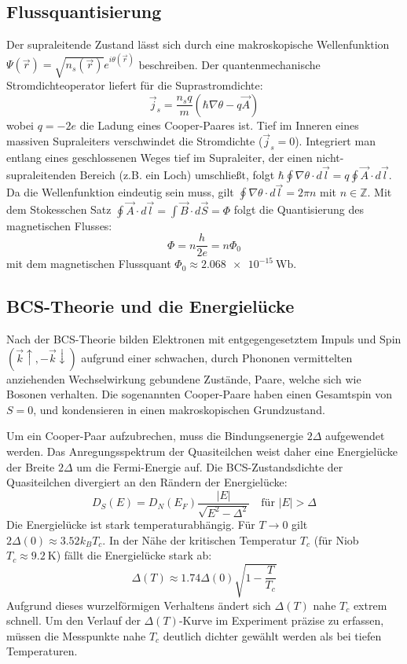 \subsection{Flussquantisierung}
Der supraleitende Zustand lässt sich durch eine makroskopische Wellenfunktion $\Psi(\vec{r}) = \sqrt{n_s(\vec{r})} e^{i\theta(\vec{r})}$ beschreiben. Der quantenmechanische Stromdichteoperator liefert für die Suprastromdichte:
\begin{equation}
    \vec{j}_s = \frac{n_s q}{m} (\hbar \nabla \theta - q \vec{A})
\end{equation}
wobei $q = -2e$ die Ladung eines Cooper-Paares ist. Tief im Inneren eines massiven Supraleiters verschwindet die Stromdichte ($\vec{j}_s = 0$). Integriert man entlang eines geschlossenen Weges tief im Supraleiter, der einen nicht-supraleitenden Bereich (z.B. ein Loch) umschließt, folgt $\hbar \oint \nabla \theta \cdot d\vec{l} = q \oint \vec{A} \cdot d\vec{l}$. Da die Wellenfunktion eindeutig sein muss, gilt $\oint \nabla \theta \cdot d\vec{l} = 2\pi n$ mit $n \in \mathbb{Z}$. Mit dem Stokesschen Satz $\oint \vec{A} \cdot d\vec{l} = \int \vec{B} \cdot d\vec{S} = \Phi$ folgt die Quantisierung des magnetischen Flusses:
\begin{equation}
    \Phi = n \frac{h}{2e} = n \Phi_0
\end{equation}
mit dem magnetischen Flussquant $\Phi_0 \approx \SI{2.068e-15}{\weber}$.

\subsection{BCS-Theorie und die Energielücke}
Nach der BCS-Theorie bilden Elektronen mit entgegengesetztem Impuls und Spin $(\vec{k}\uparrow, -\vec{k}\downarrow)$ aufgrund einer schwachen, durch Phononen vermittelten anziehenden Wechselwirkung gebundene Zustände, Paare, welche sich wie Bosonen verhalten. Die sogenannten Cooper-Paare haben einen Gesamtspin von $S=0$, und kondensieren in einen makroskopischen Grundzustand. 

Um ein Cooper-Paar aufzubrechen, muss die Bindungsenergie $2\Delta$ aufgewendet werden. Das Anregungsspektrum der Quasiteilchen weist daher eine Energielücke der Breite $2\Delta$ um die Fermi-Energie auf. Die BCS-Zustandsdichte der Quasiteilchen divergiert an den Rändern der Energielücke:
\begin{equation}
    D_S(E) = D_N(E_F) \frac{|E|}{\sqrt{E^2 - \Delta^2}} \quad \text{für } |E| > \Delta
\end{equation}
Die Energielücke ist stark temperaturabhängig. Für $T \to 0$ gilt $2\Delta(0) \approx 3.52 k_B T_c$. In der Nähe der kritischen Temperatur $T_c$ (für Niob $T_c \approx \SI{9.2}{\kelvin}$) fällt die Energielücke stark ab:
\begin{equation}
    \Delta(T) \approx 1.74 \Delta(0) \sqrt{1 - \frac{T}{T_c}}
    \label{eq:DeltaT}
\end{equation}
Aufgrund dieses wurzelförmigen Verhaltens ändert sich $\Delta(T)$ nahe $T_c$ extrem schnell. Um den Verlauf der $\Delta(T)$-Kurve im Experiment präzise zu erfassen, müssen die Messpunkte nahe $T_c$ deutlich dichter gewählt werden als bei tiefen Temperaturen.


